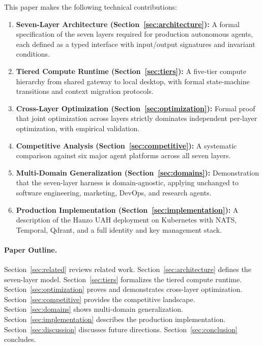 This paper makes the following technical contributions:

\begin{enumerate}[leftmargin=1.5em]
    \item \textbf{Seven-Layer Architecture (Section~\ref{sec:architecture}):}
          A formal specification of the seven layers required for production
          autonomous agents, each defined as a typed interface with input/output
          signatures and invariant conditions.
    \item \textbf{Tiered Compute Runtime (Section~\ref{sec:tiers}):}
          A five-tier compute hierarchy from shared gateway to local desktop,
          with formal state-machine transitions and context migration protocols.
    \item \textbf{Cross-Layer Optimization (Section~\ref{sec:optimization}):}
          Formal proof that joint optimization across layers strictly dominates
          independent per-layer optimization, with empirical validation.
    \item \textbf{Competitive Analysis (Section~\ref{sec:competitive}):}
          A systematic comparison against six major agent platforms across all
          seven layers.
    \item \textbf{Multi-Domain Generalization (Section~\ref{sec:domains}):}
          Demonstration that the seven-layer harness is domain-agnostic,
          applying unchanged to software engineering, marketing, DevOps, and
          research agents.
    \item \textbf{Production Implementation (Section~\ref{sec:implementation}):}
          A description of the Hanzo UAH deployment on Kubernetes with NATS,
          Temporal, Qdrant, and a full identity and key management stack.
\end{enumerate}

\paragraph{Paper Outline.}
Section~\ref{sec:related} reviews related work. Section~\ref{sec:architecture}
defines the seven-layer model. Section~\ref{sec:tiers} formalizes the tiered
compute runtime. Section~\ref{sec:optimization} proves and demonstrates
cross-layer optimization. Section~\ref{sec:competitive} provides the competitive
landscape. Section~\ref{sec:domains} shows multi-domain generalization.
Section~\ref{sec:implementation} describes the production implementation.
Section~\ref{sec:discussion} discusses future directions.
Section~\ref{sec:conclusion} concludes.

